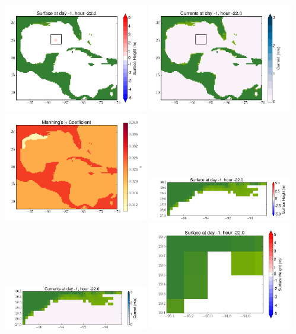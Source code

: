 \documentclass[11pt]{article}
\begin{document}
\vskip 10pt 
\includegraphics[width=0.475\textwidth]{frame0026fig1.png}
\includegraphics[width=0.475\textwidth]{frame0026fig2.png}
\vskip 10pt 
\includegraphics[width=0.475\textwidth]{frame0026fig3.png}
\includegraphics[width=0.475\textwidth]{frame0026fig4.png}
\vskip 10pt 
\includegraphics[width=0.475\textwidth]{frame0026fig5.png}
\includegraphics[width=0.475\textwidth]{frame0026fig6.png}
\end{document}
